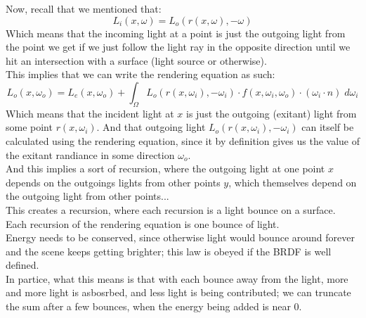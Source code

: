 \documentclass[12pt]{article}
\begin{document}
Now, recall that we mentioned that:
\[ L_i(x, \omega) = L_o(r(x, \omega), -\omega) \]
Which means that the incoming light at a point
is just the outgoing light from the point
we get if we just follow the light ray
in the opposite direction until we hit
an intersection with a surface (light source
or otherwise). \\
This implies that we can write the rendering
equation as such:
\[ L_{o}(x, \omega_o)
= L_{e}(x, \omega_o)
+ \int_\Omega L_o(r(x, \omega_i), -\omega_i)  \cdot
f(x, \omega_i, \omega_o) \cdot
(\omega_i \cdot n) \; d\omega_i \]
Which means that the incident light at $x$
is just the outgoing (exitant) light 
from some point $r(x, \omega_i)$.
And that outgoing light $L_o(r(x, \omega_i), -\omega_i)$
can itself be calculated using the rendering
equation, since it by definition
gives us the value of the exitant randiance
in some direction $\omega_o$. \\

And this implies a sort of recursion,
where the outgoing light at one point $x$
depends on the outgoings lights from other points $y$,
which themselves depend on the outgoing light
from other points... \\
This creates a recursion, where each recursion
is a light bounce on a surface. \\

Each recursion of the rendering equation
is one bounce of light. \\
Energy needs to be conserved, since otherwise light would
bounce around forever and the scene keeps getting brighter;
this law is obeyed if the BRDF is well defined. \\
In partice, what this means is that with each bounce
away from the light, more and more light is asbosrbed,
and less light is being contributed; we can truncate
the sum after a few bounces, when the energy being
added is near $0$. \\
\end{document}
